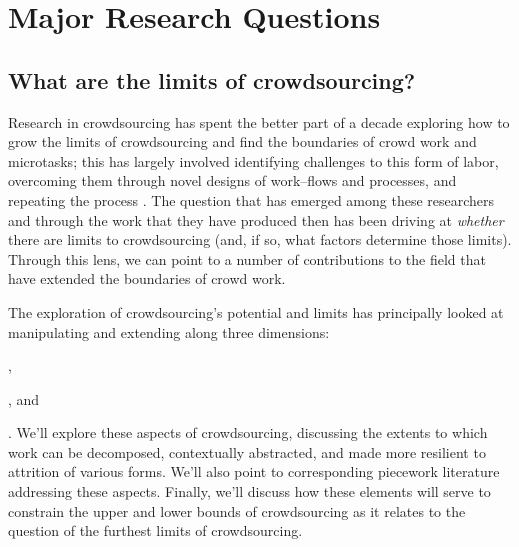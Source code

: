 \documentclass[trackingWork]{subfiles}
\begin{document}
\section{Major Research Questions}


\subsection{What are the limits of crowdsourcing?}
Research in crowdsourcing has spent the better part of a decade
exploring how to grow the limits of crowdsourcing and
find the boundaries of crowd work and microtasks;
this has largely involved
  identifying challenges to this form of labor,
  overcoming them through novel designs of work--flows and processes, and
  repeating the process
\cite{bernsteinSoylent}.
The question that has emerged
among these researchers and
through the work that they have produced then
has been driving at \textit{whether} there are limits to crowdsourcing
(and, if so, what factors determine those limits).
Through this lens, we can point to
a number of contributions to the field that have extended the boundaries of crowd work.

The exploration of crowdsourcing's potential and limits has principally looked at
manipulating and extending along three dimensions:
\begin{inlinelist}
  \item {},
  \item {}, and
  \item {}
\end{inlinelist}.
We'll explore these aspects of crowdsourcing,
discussing the extents to which work can be
decomposed,
contextually abstracted, and
made more resilient to attrition of various forms.
We'll also point to corresponding piecework literature addressing these aspects.
Finally, we'll discuss how these elements will serve
to constrain the upper and lower bounds of crowdsourcing as it relates
to the question of the furthest limits of crowdsourcing.
\end{document}
